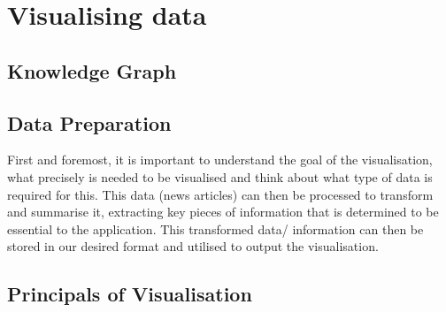\section{Visualising data}

\subsection{Knowledge Graph} \label{Knowledge_graph}

\subsection{Data Preparation}
First and foremost, it is important to understand the goal of the visualisation, what precisely is needed to be visualised and think about what type of data is required for this. This data (news articles) can then be processed to transform and summarise it, extracting key pieces of information that is determined to be essential to the application. This transformed data/ information can then be stored in our desired format and utilised to output the visualisation. 

\subsection{Principals of Visualisation}

